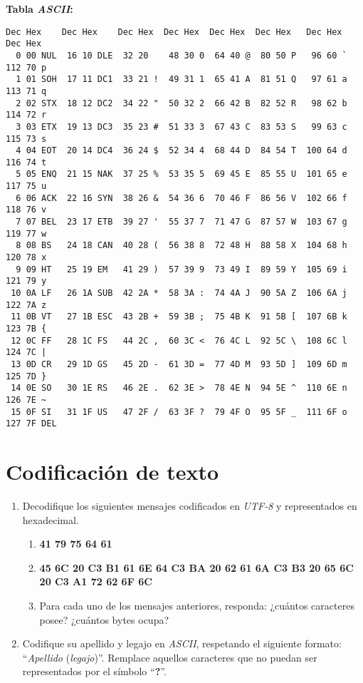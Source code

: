 \documentclass[12pt]{article}
\begin{document}
\textbf{Tabla \emph{ASCII}:}
\begin{verbatim}
Dec Hex    Dec Hex    Dec Hex  Dec Hex  Dec Hex  Dec Hex   Dec Hex   Dec Hex
  0 00 NUL  16 10 DLE  32 20    48 30 0  64 40 @  80 50 P   96 60 `  112 70 p
  1 01 SOH  17 11 DC1  33 21 !  49 31 1  65 41 A  81 51 Q   97 61 a  113 71 q
  2 02 STX  18 12 DC2  34 22 "  50 32 2  66 42 B  82 52 R   98 62 b  114 72 r
  3 03 ETX  19 13 DC3  35 23 #  51 33 3  67 43 C  83 53 S   99 63 c  115 73 s
  4 04 EOT  20 14 DC4  36 24 $  52 34 4  68 44 D  84 54 T  100 64 d  116 74 t
  5 05 ENQ  21 15 NAK  37 25 %  53 35 5  69 45 E  85 55 U  101 65 e  117 75 u
  6 06 ACK  22 16 SYN  38 26 &  54 36 6  70 46 F  86 56 V  102 66 f  118 76 v
  7 07 BEL  23 17 ETB  39 27 '  55 37 7  71 47 G  87 57 W  103 67 g  119 77 w
  8 08 BS   24 18 CAN  40 28 (  56 38 8  72 48 H  88 58 X  104 68 h  120 78 x
  9 09 HT   25 19 EM   41 29 )  57 39 9  73 49 I  89 59 Y  105 69 i  121 79 y
 10 0A LF   26 1A SUB  42 2A *  58 3A :  74 4A J  90 5A Z  106 6A j  122 7A z
 11 0B VT   27 1B ESC  43 2B +  59 3B ;  75 4B K  91 5B [  107 6B k  123 7B {
 12 0C FF   28 1C FS   44 2C ,  60 3C <  76 4C L  92 5C \  108 6C l  124 7C |
 13 0D CR   29 1D GS   45 2D -  61 3D =  77 4D M  93 5D ]  109 6D m  125 7D }
 14 0E SO   30 1E RS   46 2E .  62 3E >  78 4E N  94 5E ^  110 6E n  126 7E ~
 15 0F SI   31 1F US   47 2F /  63 3F ?  79 4F O  95 5F _  111 6F o  127 7F DEL
\end{verbatim}

\section*{Codificación de texto}

\begin{enumerate}

    \item Decodifique los siguientes mensajes codificados en \emph{UTF-8} y
        representados en hexadecimal.

        \begin{enumerate}

            \item \textbf{41 79 75 64 61}

            \item \textbf{45 6C 20 C3 B1 61 6E 64 C3 BA 20 62 61 6A C3 B3 20
                65 6C 20 C3 A1 72 62 6F 6C}

            \item Para cada uno de los mensajes anteriores, responda: ¿cuántos
                caracteres posee? ¿cuántos bytes ocupa?

        \end{enumerate}

    \item Codifique su apellido y legajo en \emph{ASCII}, respetando
        el siguiente formato: ``\textit{Apellido} (\textit{legajo})''.
        Remplace aquellos caracteres que no puedan ser representados por el
        símbolo ``\textbf{?}''.

\end{enumerate}
\end{document}
